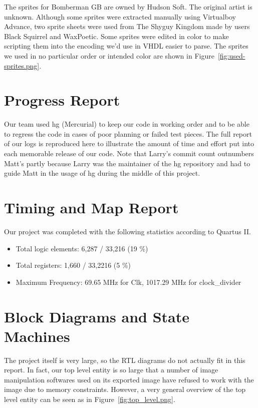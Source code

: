 \documentclass[10pt,a4paper]{article}
\newif\ifrenderBig
\begin{document}
The sprites for Bomberman GB are owned by Hudson Soft. The original artist is unknown. Although some sprites were extracted manually using Virtualboy Advance, two sprite sheets were used from The Shyguy Kingdom made by users Black Squirrel and WaxPoetic. Some sprites were edited in color to make scripting them into the encoding we'd use in VHDL easier to parse. The sprites we used in no particular order or intended color are shown in Figure~\ref{fig:used-sprites.png}.

\section{Progress Report}
Our team used hg (Mercurial) to keep our code in working order and to be able to regress the code in cases of poor planning or failed test pieces. The full report of our logs is reproduced here to illustrate the amount of time and effort put into each memorable release of our code. Note that Larry's commit count outnumbers Matt's partly because Larry was the maintainer of the hg repository and had to guide Matt in the usage of hg during the middle of this project.

\ifrenderBig
{\small

}
\fi

\section{Timing and Map Report}

Our project was completed with the following statistics according to Quartus II.
\begin{itemize}
\item Total logic elements: 6,287 / 33,216 (19 \%)
\item Total registers: 1,660 / 33,2216 (5 \%)
\item Maximum Frequency: 69.65 MHz for Clk, 1017.29 MHz for clock\_divider
\end{itemize}

\section{Block Diagrams and State Machines}

The project itself is very large, so the RTL diagrams do not actually fit in this report. In fact, our top level entity is so large that a number of image manipulation softwares used on its exported image have refused to work with the image due to memory constraints. However, a very general overview of the top level entity can be seen as in Figure~\ref{fig:top_level.png}.
\end{document}
